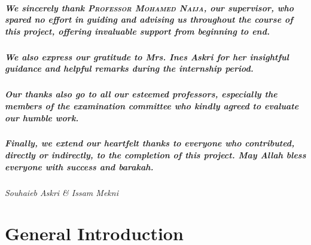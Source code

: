 \documentclass[a4paper,12pt]{report}
\begin{document}
\paragraph{We sincerely thank {\large\textsc{Professor Mohamed Naija}}, our supervisor, who spared no effort in guiding and advising us throughout the course of this project, offering invaluable support from beginning to end.}

\vspace{0.5cm}

\paragraph{We also express our gratitude to {\large\emph{Mrs. Ines Askri}} for her insightful guidance and helpful remarks during the internship period.}

\vspace{0.5cm}

\paragraph{Our thanks also go to all our esteemed professors, especially the members of the \textbf{examination committee} who kindly agreed to evaluate our humble work.}

\vspace{0.5cm}

\paragraph{Finally, we extend our heartfelt thanks to everyone who contributed, directly or indirectly, to the completion of this project. May Allah bless everyone with success and barakah.}

\vspace{1cm}

\begin{flushright}
{\large\textit{Souhaieb Askri \& Issam Mekni}}
\end{flushright}

\vspace{1cm}

\newpage

\tableofcontents
\newpage
\listoffigures
\newpage

\listoftables
\newpage
\chapter{General Introduction}
\label{chap:general_introduction}
\end{document}

